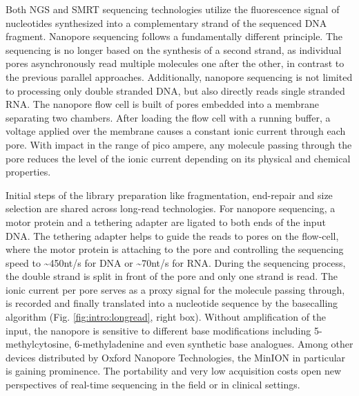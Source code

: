 Both NGS and SMRT sequencing technologies utilize the fluorescence signal of nucleotides synthesized into a complementary strand of the sequenced DNA fragment.
Nanopore sequencing follows a fundamentally different principle.
The sequencing is no longer based on the synthesis of a second strand, as individual pores asynchronously read multiple molecules one after the other, in contrast to the previous parallel approaches.
Additionally, nanopore sequencing is not limited to processing only double stranded DNA, but also directly reads single stranded RNA.
The nanopore flow cell is built of pores embedded into a membrane separating two chambers.
After loading the flow cell with a running buffer, a voltage applied over the membrane causes a constant ionic current through each pore.
With impact in the range of pico ampere, any molecule passing through the pore reduces the level of the ionic current depending on its physical and chemical properties.

Initial steps of the library preparation like fragmentation, end-repair and size selection are shared across long-read technologies.
For nanopore sequencing, a motor protein and a tethering adapter are ligated to both ends of the input DNA.
The tethering adapter helps to guide the reads to pores on the flow-cell, where the motor protein is attaching to the pore and controlling the sequencing speed to \textasciitilde450nt/s for DNA or \textasciitilde70nt/s for RNA.
During the sequencing process, the double strand is split in front of the pore and only one strand is read.
The ionic current per pore serves as a proxy signal for the molecule passing through, is recorded and finally translated into a nucleotide sequence by the basecalling algorithm (Fig. \ref{fig:intro:longread}, right box).
Without amplification of the input, the nanopore is sensitive to different base modifications including 5-methylcytosine, 6-methyladenine and even synthetic base analogues.
Among other devices distributed by Oxford Nanopore Technologies, the MinION in particular is gaining prominence. 
The portability and very low acquisition costs open new perspectives of real-time sequencing in the field or in clinical settings.



